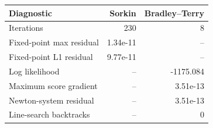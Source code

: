 \begin{tabular}{@{}lrr@{}}
\toprule
Diagnostic & Sorkin & Bradley--Terry \\
\midrule
Iterations & 230 & 8 \\
Fixed-point max residual & 1.34e-11 & -- \\
Fixed-point L1 residual & 9.77e-11 & -- \\
Log likelihood & -- & -1175.084 \\
Maximum score gradient & -- & 3.51e-13 \\
Newton-system residual & -- & 3.51e-13 \\
Line-search backtracks & -- & 0 \\
\bottomrule
\end{tabular}
